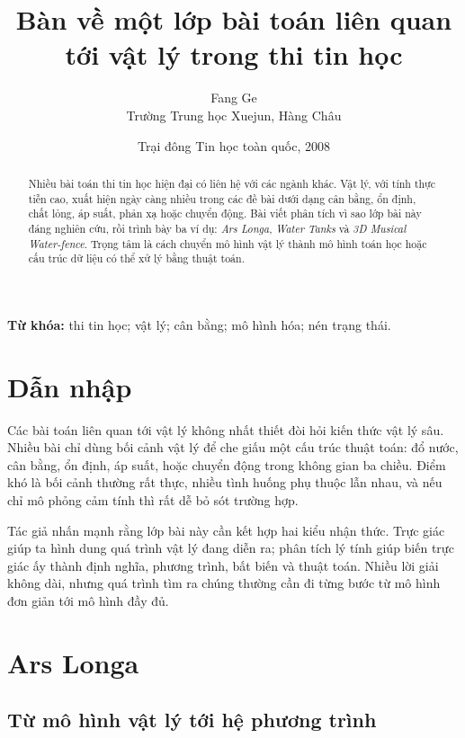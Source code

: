 \documentclass[11pt]{article}
\title{Bàn về một lớp bài toán liên quan tới vật lý trong thi tin học}
\author{Fang Ge\\Trường Trung học Xuejun, Hàng Châu}
\date{Trại đông Tin học toàn quốc, 2008}
\begin{document}
\maketitle


\renewcommand{\abstractname}{Tóm tắt}
\begin{abstract}
Nhiều bài toán thi tin học hiện đại có liên hệ với các ngành khác. Vật lý, với
tính thực tiễn cao, xuất hiện ngày càng nhiều trong các đề bài dưới dạng cân
bằng, ổn định, chất lỏng, áp suất, phản xạ hoặc chuyển động. Bài viết phân tích
vì sao lớp bài này đáng nghiên cứu, rồi trình bày ba ví dụ: \textit{Ars
Longa}, \textit{Water Tanks} và \textit{3D Musical Water-fence}. Trọng tâm là
cách chuyển mô hình vật lý thành mô hình toán học hoặc cấu trúc dữ liệu có thể
xử lý bằng thuật toán.
\end{abstract}

\noindent\textbf{Từ khóa:} thi tin học; vật lý; cân bằng; mô hình hóa; nén
trạng thái.

\section{Dẫn nhập}

Các bài toán liên quan tới vật lý không nhất thiết đòi hỏi kiến thức vật lý sâu.
Nhiều bài chỉ dùng bối cảnh vật lý để che giấu một cấu trúc thuật toán: đổ nước,
cân bằng, ổn định, áp suất, hoặc chuyển động trong không gian ba chiều. Điểm
khó là bối cảnh thường rất thực, nhiều tình huống phụ thuộc lẫn nhau, và nếu
chỉ mô phỏng cảm tính thì rất dễ bỏ sót trường hợp.

Tác giả nhấn mạnh rằng lớp bài này cần kết hợp hai kiểu nhận thức. Trực giác
giúp ta hình dung quá trình vật lý đang diễn ra; phân tích lý tính giúp biến
trực giác ấy thành định nghĩa, phương trình, bất biến và thuật toán. Nhiều lời
giải không dài, nhưng quá trình tìm ra chúng thường cần đi từng bước từ mô
hình đơn giản tới mô hình đầy đủ.

\section{Ars Longa}

\subsection{Từ mô hình vật lý tới hệ phương trình}
\end{document}
